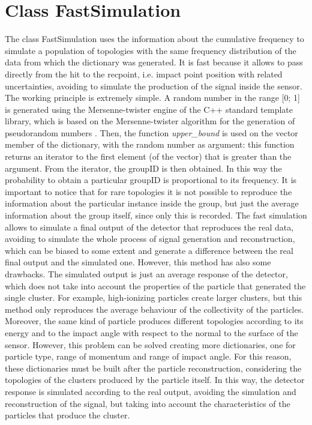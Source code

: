 \section{Class FastSimulation}
\label{sec:fast}
The class FastSimulation uses the information about the cumulative frequency to simulate a population of topologies with the same frequency distribution of the data from which the dictionary was generated. It is fast because it allows to pass directly from the hit to the recpoint, i.e. impact point position with related uncertainties, avoiding to simulate the production of the signal inside the sensor. The working principle is extremely simple. A random number in the range [0; 1] is generated using the Mersenne-twister engine of the C++ standard template library, which is based on the Mersenne-twister algorithm for the generation of pseudorandom numbers \cite{mersenne}. Then, the function \textit{upper\_bound} is used on the vector member of the dictionary, with the random number as argument: this function returns an iterator to the first element (of the vector) that is greater than the argument. From the iterator, the groupID is then obtained. In this way the probability to obtain a particular groupID is proportional to its frequency. It is important to notice that for rare topologies it is not possible to reproduce the information about the particular instance inside the group, but just the average information about the group itself, since only this is recorded. The fast simulation allows to simulate a final output of the detector that reproduces the real data, avoiding to simulate the whole process of signal generation and reconstruction, which can be biased to some extent and generate a difference between the real final output and the simulated one. However, this method has also some drawbacks. The simulated output is just an average response of the detector, which does not take into account the properties of the particle that generated the single cluster. For example, high-ionizing particles create larger clusters, but this method only reproduces the average behaviour of the collectivity of the particles. Moreover, the same kind of particle produces different topologies according to its energy and to the impact angle with respect to the normal to the surface of the sensor. However, this problem can be solved creating more dictionaries, one for particle type, range of momentum and range of impact angle. For this reason, these dictionaries must be built after the particle reconstruction, considering the topologies of the clusters produced by the particle itself. In this way, the detector response is simulated according to the real output, avoiding the simulation and reconstruction of the signal, but taking into account the characteristics of the particles that produce the cluster.
%
